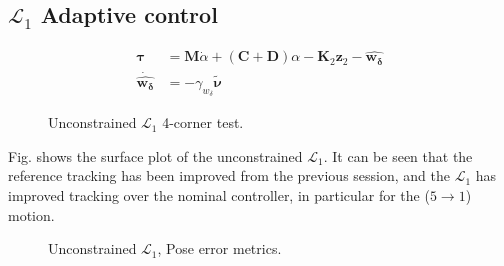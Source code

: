 \subsection{$\mathcal{L}_1$ Adaptive control}

\begin{align}
    \boldsymbol{\tau} &= \boldsymbol{M}\dot{\alpha} + (\boldsymbol{C + D})\alpha - \boldsymbol{K}_2\boldsymbol{z}_2 -\boldsymbol{\hat{w_{\delta}}}  \\
    \boldsymbol{\dot{\hat{w_{\delta}}}} &=-\gamma_{w_\delta}\tilde{\boldsymbol{\nu}} 
\end{align}

\begin{figure}[!h]
    \centering
    \caption{Unconstrained $\mathcal{L}_1$ 4-corner test. }
\end{figure}\label{fig:L14corner2}

Fig. shows the surface plot of the unconstrained $\mathcal{L}_1$. It can be seen that the reference tracking has been improved from the previous session, and the $\mathcal{L}_1$ has improved tracking over the nominal controller, in particular for the  ($5 \xrightarrow{} 1$) motion. 

\begin{figure}[!h]
    \centering
    \caption{Unconstrained $\mathcal{L}_1$, Pose error metrics. }
\end{figure}\label{fig:L1metric2}

